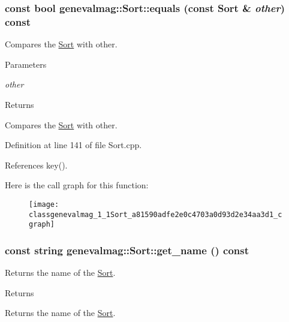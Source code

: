 \hypertarget{classgenevalmag_1_1Sort_a81590adfe2e0c4703a0d93d2e34aa3d1}{
\subsubsection[{equals}]{\setlength{\rightskip}{0pt plus 5cm}const bool genevalmag::Sort::equals (const {\bf Sort} \& {\em other}) const}}
\label{classgenevalmag_1_1Sort_a81590adfe2e0c4703a0d93d2e34aa3d1}
Compares the \hyperlink{classgenevalmag_1_1Sort}{Sort} with other. 
\begin{DoxyParams}{Parameters}
\item[{\em other}]\end{DoxyParams}
\begin{DoxyReturn}{Returns}

\end{DoxyReturn}
Compares the \hyperlink{classgenevalmag_1_1Sort}{Sort} with other. 

Definition at line 141 of file Sort.cpp.



References key().



Here is the call graph for this function:\nopagebreak
\begin{figure}[H]
\begin{center}
\leavevmode
\texttt{[image: classgenevalmag\_1\_1Sort\_a81590adfe2e0c4703a0d93d2e34aa3d1\_cgraph]}
\end{center}
\end{figure}


\hypertarget{classgenevalmag_1_1Sort_a5bbccf82148fea12f958bd276a009fd4}{
\subsubsection[{get\_\-name}]{\setlength{\rightskip}{0pt plus 5cm}const string genevalmag::Sort::get\_\-name () const}}
\label{classgenevalmag_1_1Sort_a5bbccf82148fea12f958bd276a009fd4}
Returns the name of the \hyperlink{classgenevalmag_1_1Sort}{Sort}. \begin{DoxyReturn}{Returns}

\end{DoxyReturn}
Returns the name of the \hyperlink{classgenevalmag_1_1Sort}{Sort}. 

